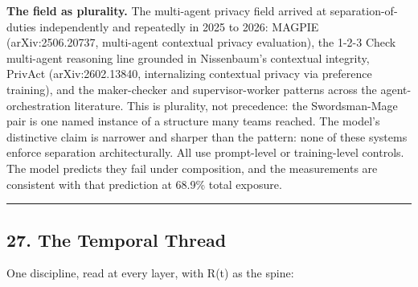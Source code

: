 \documentclass[
  11pt,
]{article}
\newcounter{none} %
\begin{document}
\textbf{The field as plurality.} The multi-agent privacy field arrived
at separation-of-duties independently and repeatedly in 2025 to 2026:
MAGPIE (arXiv:2506.20737, multi-agent contextual privacy evaluation),
the 1-2-3 Check multi-agent reasoning line grounded in Nissenbaum's
contextual integrity, PrivAct (arXiv:2602.13840, internalizing
contextual privacy via preference training), and the maker-checker and
supervisor-worker patterns across the agent-orchestration literature.
This is plurality, not precedence: the Swordsman-Mage pair is one named
instance of a structure many teams reached. The model's distinctive
claim is narrower and sharper than the pattern: none of these systems
enforce separation architecturally. All use prompt-level or
training-level controls. The model predicts they fail under composition,
and the measurements are consistent with that prediction at 68.9\% total
exposure.

\begin{center}\rule{0.5\linewidth}{0.5pt}\end{center}

\subsection{27. The Temporal Thread}\label{the-temporal-thread}

One discipline, read at every layer, with R(t) as the spine:
\end{document}
